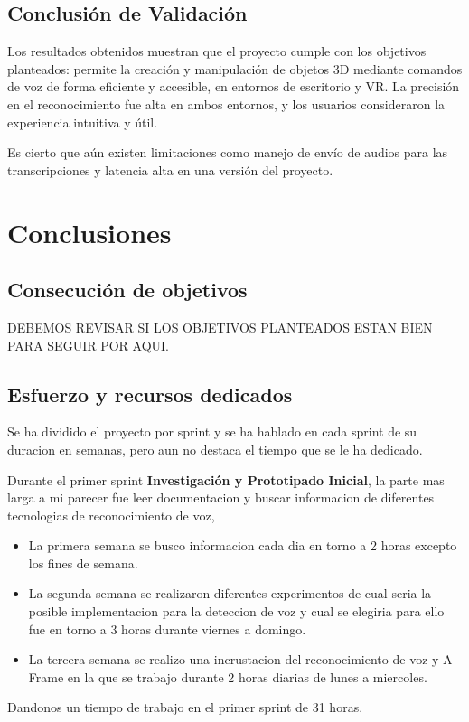 \documentclass[a4paper, 12pt]{book}
\let\cleardoublepage\clearpage
\begin{document}
\section{Conclusión de Validación}

Los resultados obtenidos muestran que el proyecto cumple con los objetivos planteados: permite la creación y manipulación de objetos 3D mediante comandos de voz de forma eficiente y accesible, en entornos de escritorio y VR. La precisión en el reconocimiento fue alta en ambos entornos, y los usuarios consideraron la experiencia intuitiva y útil.

Es cierto que aún existen limitaciones como manejo de envío de audios para las transcripciones y latencia alta en una versión del proyecto.


\cleardoublepage


\cleardoublepage
\chapter{Conclusiones}
\label{chap:conclusiones}


\section{Consecución de objetivos}
\label{sec:consecucion-objetivos}

DEBEMOS REVISAR SI LOS OBJETIVOS PLANTEADOS ESTAN BIEN PARA SEGUIR POR AQUI.

\section{Esfuerzo y recursos dedicados}
\label{sec:esfuerzo-recursos}

Se ha dividido el proyecto por sprint y se ha hablado en cada sprint de su duracion en semanas, pero aun no destaca el tiempo que se le ha dedicado.

Durante el primer sprint \textbf{Investigación y Prototipado Inicial}, la parte mas larga a mi parecer fue leer documentacion y buscar informacion de diferentes tecnologias de reconocimiento de voz,
\begin{itemize}
  \item La primera semana se busco informacion cada dia en torno a 2 horas excepto los fines de semana.
  \item La segunda semana se realizaron diferentes experimentos de cual seria la posible implementacion para la deteccion de voz y cual se elegiria para ello fue en torno a 3 horas durante viernes a domingo. 
  \item La tercera semana se realizo una incrustacion del reconocimiento de voz y A-Frame en la que se trabajo durante 2 horas diarias de lunes a miercoles.
\end{itemize}
Dandonos un tiempo de trabajo en el primer sprint de 31 horas.
\end{document}
